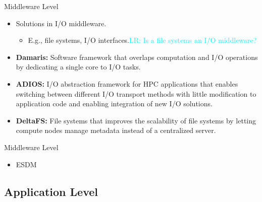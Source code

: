\documentclass[compress,11pt,xcolor=svgnames,aspectratio=169]{beamer}
\newcommand{\lr}[1]{\textcolor{cyan}{LR: #1}}
\begin{document}
\begin{frame}[fragile]{Middleware Level}

\begin{itemize}
\setlength\itemsep{0.4cm}

\item Solutions in I/O middleware.

    \begin{itemize}

    \item E.g., file systems, I/O interfaces.\lr{Is a file systems an I/O middleware?}

    \end{itemize}

\item \textbf{Damaris:} Software framework that overlaps computation and I/O operations by dedicating a single core to I/O tasks.

\item \textbf{ADIOS:} I/O abstraction framework for HPC applications that enables switching between different I/O transport methods with little modification to application code and enabling integration of new I/O solutions.

\item \textbf{DeltaFS:} File systems that improves the scalability of file systems by letting compute nodes manage metadata instead of a centralized server.

\end{itemize}

\nocite{3372390}

\end{frame}

\begin{frame}[fragile]{Middleware Level}

\begin{itemize}
\setlength\itemsep{0.4cm}

\item ESDM

\end{itemize}


\end{frame}

\subsection{Application Level}
\end{document}
